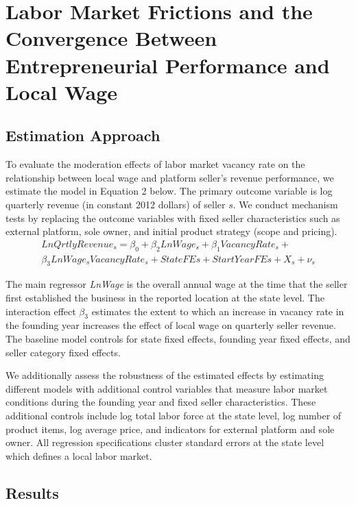 \documentclass[letterpaper,12pt]{article}
\begin{document}
\section{Labor Market Frictions and the Convergence Between Entrepreneurial Performance and Local Wage}


\subsection{Estimation Approach} \label{sec:h2}

To evaluate the moderation effects of labor market vacancy rate on the relationship between local wage and platform seller's revenue performance, we estimate the model in Equation 2 below. The primary outcome variable is log quarterly revenue (in constant 2012 dollars) of seller $s$. We conduct mechanism tests by replacing the outcome variables with fixed seller characteristics such as external platform, sole owner, and initial product strategy (scope and pricing).
\begin{eqnarray} \label{eq:h2}
LnQrtlyRevenue_{s}= \beta_{0} + \beta_{2}LnWage_{s} + \beta_{1}VacancyRate_{s} +  \nonumber \\ \beta_{3}LnWage_{s}VacancyRate_{s}+StateFEs+StartYearFEs+X_{s}+\nu_{s}
\end{eqnarray}

The main regressor \textit{LnWage} is the overall annual wage at the time that the seller first established the business in the reported location at the state level. The interaction effect $\beta_{3}$ estimates the extent to which an increase in vacancy rate in the founding year increases the effect of local wage on quarterly seller revenue. The baseline model controls for state fixed effects, founding year fixed effects, and seller category fixed effects.

We additionally assess the robustness of the estimated effects by estimating different models with additional control variables that measure labor market conditions during the founding year and fixed seller characteristics. These additional controls include log total labor force at the state level, log number of product items, log average price, and indicators for external platform and sole owner. All regression specifications cluster standard errors at the state level which defines a local labor market. 



\subsection{Results}
\end{document}
